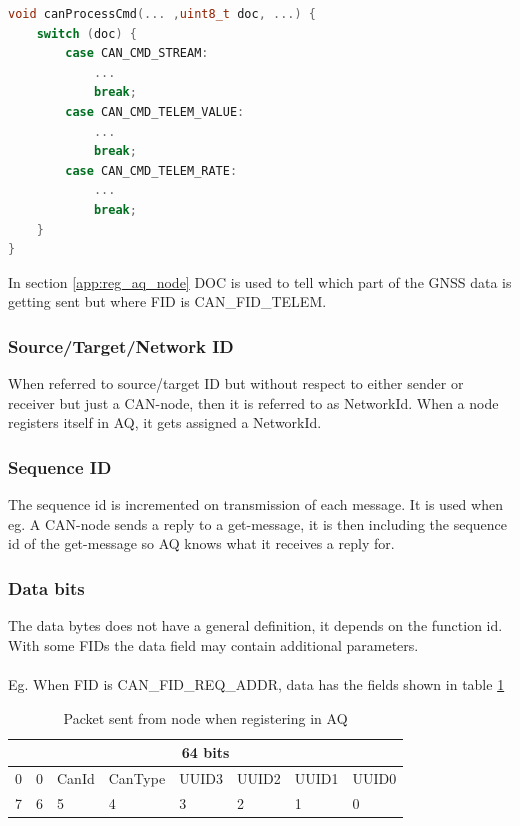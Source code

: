 \begin{lstlisting}[language = c, caption = Snippet of AQ's can.c:365, label=code:doc_useage]
void canProcessCmd(... ,uint8_t doc, ...) {
    switch (doc) {
        case CAN_CMD_STREAM:
        	...
            break;
        case CAN_CMD_TELEM_VALUE:
        	...
            break;
        case CAN_CMD_TELEM_RATE:
        	...
            break;
    }
}
\end{lstlisting}

In section \ref{app:reg_aq_node} DOC is used to tell which part of the GNSS data is getting sent but where FID is CAN\_FID\_TELEM.

\subsubsection*{Source/Target/Network ID}
When referred to source/target ID but without respect to either sender or receiver but just a CAN-node, then it is referred to as NetworkId. When a node registers itself in AQ, it gets assigned a NetworkId.

\subsubsection*{Sequence ID}
The sequence id is incremented on transmission of each message. It is used when eg. 
A CAN-node sends a reply to a get-message, it is then including the sequence id of the get-message so AQ knows what it receives a reply for.

\subsubsection*{Data bits} \label{app:data_bits}
The data bytes does not have a general definition, it depends on the function id. With some FIDs the data field may contain additional parameters.\\ \\
Eg. When FID is CAN\_FID\_REQ\_ADDR, data has the fields shown in table \ref{tab:packet_from_node}
\begin{table}[H]
\centering
\caption{Packet sent from node when registering in AQ}
\label{tab:packet_from_node}
\begin{tabularx}{0.92\textwidth}{@{}|X|X|X|X|X|X|X|X|@{}}
\toprule
\multicolumn{8}{|c|}{64 bits}                           \\ \midrule
0 & 0 & CanId & CanType & UUID3 & UUID2 & UUID1 & UUID0 \\
\midrule
7 & 6 & 5 & 4 & 3 & 2 & 1 & 0 \\ \bottomrule
\end{tabularx}
\end{table}

